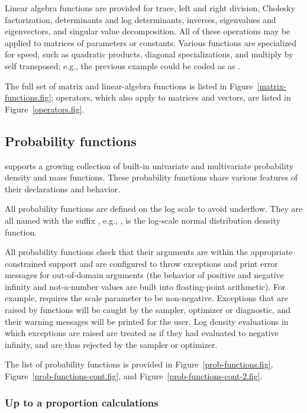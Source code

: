 \documentclass[article]{jss}
\begin{document}
Linear algebra functions are provided for trace, left and right
division, Cholesky factorization, determinants and log determinants,
inverses, eigenvalues and eigenvectors, and singular value
decomposition.  All of these operations may be applied to matrices of
parameters or constants.  Various functions are specialized for speed,
such as quadratic products, diagonal specializations, and multiply by
self transposed; e.g., the previous example
 could be coded as
as .

The full set of matrix and linear-algebra functions is listed in
Figure~\ref{matrix-functions.fig}; operators, which also apply to
matrices and vectors, are listed in Figure~\ref{operators.fig}.

\subsection{Probability functions}

 supports a growing collection of built-in univariate and
multivariate probability density and mass functions.  These
probability functions share various features of their declarations and
behavior.

All probability functions are defined on the log scale to avoid
underflow.  They are all named with the suffix , e.g.,
, is the log-scale normal distribution density
function.

All probability functions check that their arguments are within the
appropriate constrained support and are configured to throw exceptions
and print error messages for out-of-domain arguments (the behavior of
positive and negative infinity and not-a-number values are built into
floating-point arithmetic).  For example, 
  requires the scale parameter  to
be non-negative.  Exceptions that are raised by functions will be
caught by the sampler, optimizer or diagnostic, and their warning
messages will be printed for the user.  Log density evaluations in
which exceptions are raised are treated as if they had evaluated to
negative infinity, and are thus rejected by the sampler or optimizer.

The list of probability functions is provided in
Figure~\ref{prob-functions.fig}, 
Figure~\ref{prob-functions-cont.fig}, and
Figure~\ref{prob-functions-cont-2.fig}. 

\subsubsection{Up to a proportion calculations}
\end{document}
